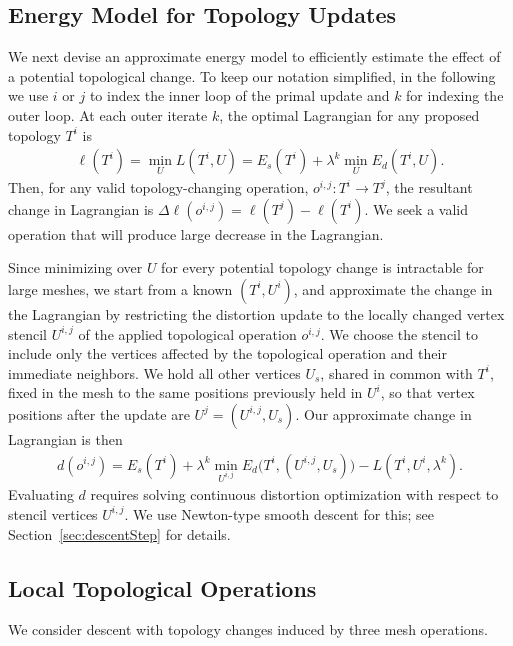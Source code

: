 \subsection{Energy Model for Topology Updates}
\label{sec:topology_energy}
We next devise an approximate energy model to efficiently estimate the effect of a potential topological change. 
To keep our notation simplified, in the following we use $i$ or $j$ to index the inner loop of the primal update and $k$ for indexing the outer loop.
At each outer iterate $k$, the optimal Lagrangian for any proposed topology $T^i$ is  
\begin{align}
\ell(T^i) = \min_{U} L(T^i, U) = E_s(T^i) + \lambda^k \min_{U} E_d(T^i, U).
\end{align}
Then, for any valid topology-changing operation, $o^{i,j}:T^i \rightarrow T^j$, the resultant change in Lagrangian is $\Delta \ell(o^{i,j}) = \ell(T^j) - \ell(T^i)$. We seek a valid operation that will produce large decrease in the Lagrangian.


Since minimizing over $U$ for every potential topology change is intractable for large meshes, we start from a known $(T^i, U^i)$, and approximate the change in the Lagrangian by restricting the distortion update to the locally changed vertex stencil $U^{i,j}$ of the applied topological operation $o^{i,j}$. We choose the stencil to include only the vertices affected by the topological operation and their immediate neighbors.
We hold all other vertices $U_s$, shared in common with $T^i$, fixed in the mesh
to the same positions previously held in $U^i$, so that vertex positions after the update are $U^j = (U^{i,j}, U_s)$.  Our approximate change in Lagrangian is then 
\begin{align} 
d(o^{i,j}) = E_s(T^i) + \lambda^k \min_{U^{i,j}} E_d \big( T^i, (U^{i,j}, U_s) \big) - L(T^i,U^i,\lambda^k).
\end{align}
%
Evaluating $d$ requires solving continuous distortion optimization with respect to stencil vertices $U^{i,j}$. We use Newton-type smooth descent for this; see Section~\ref{sec:descentStep} for details.

\subsection{Local Topological Operations}
\label{sec:topology_ops}

We consider descent with topology changes induced by three mesh operations.

